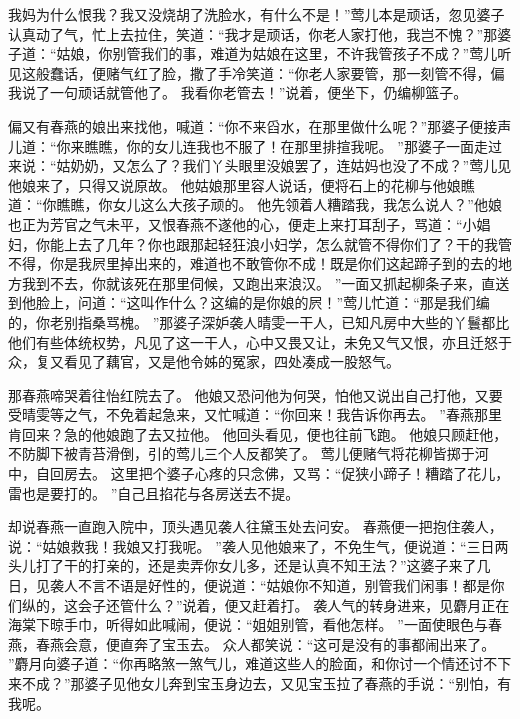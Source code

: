我妈为什么恨我？我又没烧胡了洗脸水，有什么不是！”莺儿本是顽话，忽见婆子认真动了气，忙上去拉住，笑道：“我才是顽话，你老人家打他，我岂不愧？”那婆子道：“姑娘，你别管我们的事，难道为姑娘在这里，不许我管孩子不成？”莺儿听见这般蠢话，便赌气红了脸，撒了手冷笑道：“你老人家要管，那一刻管不得，偏我说了一句顽话就管他了。
我看你老管去！”说着，便坐下，仍编柳篮子。
\par
偏又有春燕的娘出来找他，喊道：“你不来舀水，在那里做什么呢？”那婆子便接声儿道：“你来瞧瞧，你的女儿连我也不服了！在那里排揎我呢。
”那婆子一面走过来说：“姑奶奶，又怎么了？我们丫头眼里没娘罢了，连姑妈也没了不成？”莺儿见他娘来了，只得又说原故。
他姑娘那里容人说话，便将石上的花柳与他娘瞧道：“你瞧瞧，你女儿这么大孩子顽的。
他先领着人糟踏我，我怎么说人？”他娘也正为芳官之气未平，又恨春燕不遂他的心，便走上来打耳刮子，骂道：“小娼妇，你能上去了几年？你也跟那起轻狂浪小妇学，怎么就管不得你们了？干的我管不得，你是我屄里掉出来的，难道也不敢管你不成！既是你们这起蹄子到的去的地方我到不去，你就该死在那里伺候，又跑出来浪汉。
”一面又抓起柳条子来，直送到他脸上，问道：“这叫作什么？这编的是你娘的屄！”莺儿忙道：“那是我们编的，你老别指桑骂槐。
”那婆子深妒袭人晴雯一干人，已知凡房中大些的丫鬟都比他们有些体统权势，凡见了这一干人，心中又畏又让，未免又气又恨，亦且迁怒于众，复又看见了藕官，又是他令姊的冤家，四处凑成一股怒气。
\par
那春燕啼哭着往怡红院去了。
他娘又恐问他为何哭，怕他又说出自己打他，又要受晴雯等之气，不免着起急来，又忙喊道：“你回来！我告诉你再去。
”春燕那里肯回来？急的他娘跑了去又拉他。
他回头看见，便也往前飞跑。
他娘只顾赶他，不防脚下被青苔滑倒，引的莺儿三个人反都笑了。
莺儿便赌气将花柳皆掷于河中，自回房去。
这里把个婆子心疼的只念佛，又骂：“促狭小蹄子！糟踏了花儿，雷也是要打的。
”自己且掐花与各房送去不提。
\par
却说春燕一直跑入院中，顶头遇见袭人往黛玉处去问安。
春燕便一把抱住袭人，说：“姑娘救我！我娘又打我呢。
”袭人见他娘来了，不免生气，便说道：“三日两头儿打了干的打亲的，还是卖弄你女儿多，还是认真不知王法？”这婆子来了几日，见袭人不言不语是好性的，便说道：“姑娘你不知道，别管我们闲事！都是你们纵的，这会子还管什么？”说着，便又赶着打。
袭人气的转身进来，见麝月正在海棠下晾手巾，听得如此喊闹，便说：“姐姐别管，看他怎样。
”一面使眼色与春燕，春燕会意，便直奔了宝玉去。
众人都笑说：“这可是没有的事都闹出来了。
”麝月向婆子道：“你再略煞一煞气儿，难道这些人的脸面，和你讨一个情还讨不下来不成？”那婆子见他女儿奔到宝玉身边去，又见宝玉拉了春燕的手说：“别怕，有我呢。
